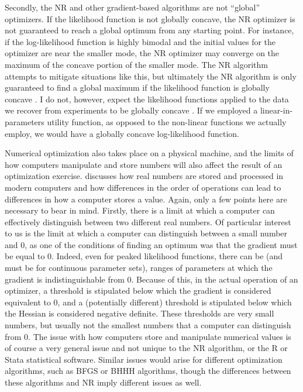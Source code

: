 \documentclass[../main.tex]{subfiles}
\begin{document}
Secondly, the NR and other gradient-based algorithms are not \enquote{global} optimizers.
If the likelihood function is not globally concave, the NR optimizer is not guaranteed to reach a global optimum from any starting point.
For instance, if the log-likelihood function is highly bimodal and the initial values for the optimizer are near the smaller mode, the NR optimizer may converge on the maximum of the concave portion of the smaller mode.
The NR algorithm attempts to mitigate situations like this{\footnotemark}, but ultimately the NR algorithm is only guaranteed to find a global maximum if the likelihood function is globally concave \parencite[218]{Train2002}.
I do not, however, expect the likelihood functions applied to the data we recover from experiments to be globally concave \parencite[227]{Train2002}.
If we employed a linear-in-parameters utility function, as opposed to the non-linear functions we actually employ, we would have a globally concave log-likelihood function.

\addtocounter{footnote}{-1}

Numerical optimization also takes place on a physical machine, and the limits of how computers manipulate and store numbers will also affect the result of an optimization exercise.
\textcite{Gould2006} discusses how real numbers are stored and processed in modern computers and how differences in the order of operations can lead to differences in how a computer stores a value.
Again, only a few points here are necessary to bear in mind.
Firstly, there is a limit at which a computer can effectively distinguish between two different real numbers.
Of particular interest to us is the limit at which a computer can distinguish between a small number and 0, as one of the conditions of finding an optimum was that the gradient must be equal to 0.{\footnotemark}
Indeed, even for peaked likelihood functions, there can be (and must be for continuous parameter sets), ranges of parameters at which the gradient is indistinguishable from 0.
Because of this, in the actual operation of an optimizer, a threshold is stipulated below which the gradient is considered equivalent to 0, and a (potentially different) threshold is stipulated below which the Hessian is considered negative definite.
These thresholds are very small numbers, but usually not the smallest numbers that a computer can distinguish from 0.
The issue with how computers store and manipulate numerical values is of course a very general issue and not unique to the NR algorithm, or the R or Stata statistical software.
Similar issues would arise for different optimization algorithms, such as BFGS or BHHH algorithms, though the differences between these algorithms and NR imply different issues as well.{\footnotemark}
\end{document}
